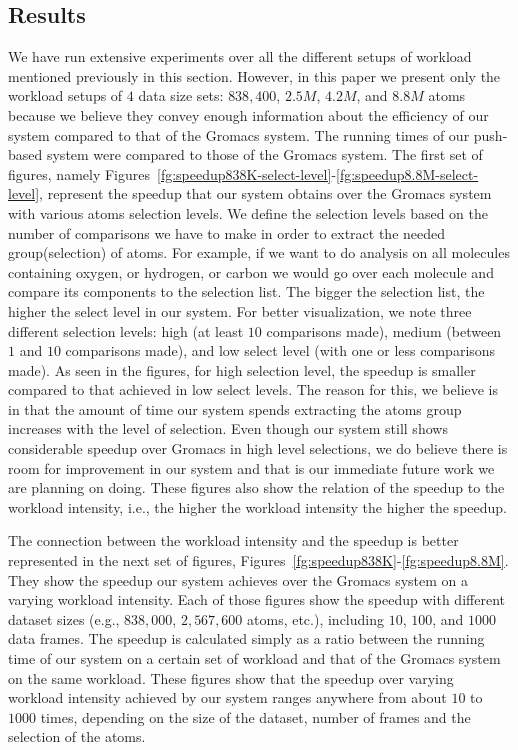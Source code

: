 \documentclass[10pt,journal,final,letterpaper,twocolumn]{IEEEtran}
\begin{document}
\subsection{Results} We have run extensive experiments over all the
different setups of workload mentioned previously in this section.
However, in this paper we present only the workload setups of $4$
data size sets: $838,400$, $2.5M$, $4.2M$, and $8.8M$ atoms because
we believe they convey enough information about the efficiency of
our system compared to that of the Gromacs system. The running times
of our push-based system were compared to those of the Gromacs
system. The first set of figures, namely
Figures~\ref{fg:speedup838K-select-level}-\ref{fg:speedup8.8M-select-level},
represent the speedup that our system obtains over the Gromacs
system with various atoms selection levels. We define the selection
levels based on the number of comparisons we have to make in order
to extract the needed group(selection) of atoms. For example, if we
want to do analysis on all molecules containing oxygen, or hydrogen,
or carbon we would go over each molecule and compare its components
to the selection list. The bigger the selection list, the higher the
select level in our system. For better visualization, we note three
different selection levels: high (at least $10$ comparisons made),
medium (between $1$ and $10$ comparisons made), and low select level
(with one or less comparisons made). As seen in the figures, for
high selection level, the speedup is smaller compared to that
achieved in low select levels. The reason for this, we believe is in
that the amount of time our system spends extracting the atoms group
increases with the level of selection. Even though our system still
shows considerable speedup over Gromacs in high level selections, we
do believe there is room for improvement in our system and that is
our immediate future work we are planning on doing. These figures
also show the relation of the speedup to the workload intensity,
i.e., the higher the workload intensity the higher the speedup.

The connection between the workload intensity and the speedup is
better represented in the next set of figures,
Figures~\ref{fg:speedup838K}-\ref{fg:speedup8.8M}. They show the
speedup our system achieves over the Gromacs system on a varying
workload intensity. Each of those figures show the speedup with
different dataset sizes (e.g., $838,000$, $2,567,600$ atoms, etc.),
including $10$, $100$, and $1000$ data frames. The speedup is
calculated simply as a ratio between the running time of our system
on a certain set of workload and that of the Gromacs system on the
same workload. These figures show that the speedup over varying
workload intensity achieved by our system ranges anywhere from about
$10$ to $1000$ times, depending on the size of the dataset, number
of frames and the selection of the atoms.
\end{document}
